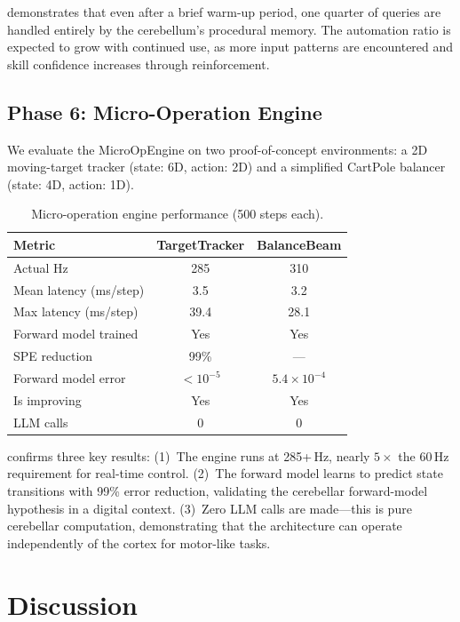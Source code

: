 \documentclass[11pt,a4paper]{article}
\begin{document}
 demonstrates that even after a brief warm-up period, one quarter of queries are handled entirely by the cerebellum's procedural memory.
The automation ratio is expected to grow with continued use, as more input patterns are encountered and skill confidence increases through reinforcement.

\subsection{Phase 6: Micro-Operation Engine}\label{sec:micro_exp}

We evaluate the MicroOpEngine on two proof-of-concept environments: a 2D moving-target tracker (state: 6D, action: 2D) and a simplified CartPole balancer (state: 4D, action: 1D).

\begin{table}[t]
\centering
\caption{Micro-operation engine performance (500 steps each).}
\label{tab:micro_ops}
\begin{tabular}{lcc}
\toprule
Metric & TargetTracker & BalanceBeam \\
\midrule
Actual Hz & 285 & 310 \\
Mean latency (ms/step) & 3.5 & 3.2 \\
Max latency (ms/step) & 39.4 & 28.1 \\
\midrule
Forward model trained & Yes & Yes \\
SPE reduction & 99\% & --- \\
Forward model error & $< 10^{-5}$ & $5.4 \times 10^{-4}$ \\
Is improving & Yes & Yes \\
\midrule
LLM calls & 0 & 0 \\
\bottomrule
\end{tabular}
\end{table}

 confirms three key results:
(1)~The engine runs at 285+\,Hz, nearly $5\times$ the 60\,Hz requirement for real-time control.
(2)~The forward model learns to predict state transitions with 99\% error reduction, validating the cerebellar forward-model hypothesis in a digital context.
(3)~Zero LLM calls are made---this is pure cerebellar computation, demonstrating that the architecture can operate independently of the cortex for motor-like tasks.

\section{Discussion}\label{sec:discussion}
\end{document}
